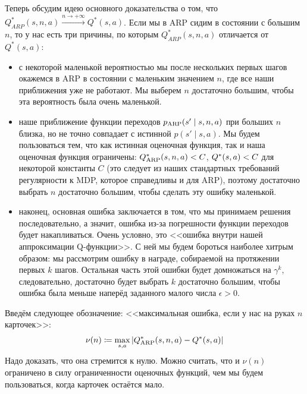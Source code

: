 Теперь обсудим идею основного доказательства о том, что $Q^*_{ARP}(s, n, a) \xrightarrow{ n \to +\infty } Q^*(s, a)$. Если мы в ARP сидим в состоянии с большим $n$, то у нас есть три причины, по которым $Q^*_{ARP}(s, n, a)$ отличается от $Q^*(s, a)$:
\begin{itemize}
    \item с некоторой маленькой вероятностью мы после нескольких первых шагов окажемся в ARP в состоянии с маленьким значением $n$, где все наши приближения уже не работают. Мы выберем $n$ достаточно большим, чтобы эта вероятность была очень маленькой.
    \item наше приближение функции переходов $p_{\mathrm{ARP}}(s' \mid s, n, a)$ при больших $n$ близка, но не точно совпадает с истинной $p(s' \mid s, a)$. Мы будем пользоваться тем, что как истинная оценочная функция, так и наша оценочная функция ограничены: $Q_{\ARP}^*(s, n, a) \HM< C$, $Q^*(s, a) \HM< C$ для некоторой константы $C$ (это следует из наших стандартных требований регулярности к MDP, которое справедливы и для ARP), поэтому достаточно выбрать $n$ достаточно большим, чтобы сделать эту ошибку маленькой.
    \item наконец, основная ошибка заключается в том, что мы принимаем решения последовательно, а значит, ошибка из-за погрешности функции переходов будет накапливаться. Очень условно, это <<ошибка внутри нашей аппроксимации Q-функции>>. С ней мы будем бороться наиболее хитрым образом: мы рассмотрим ошибку в награде, собираемой на протяжении первых $k$ шагов. Остальная часть этой ошибки будет домножаться на $\gamma^k$, следовательно, достаточно будет выбрать $k$ достаточно большим, чтобы ошибка была меньше наперёд заданного малого числа $\epsilon > 0$.
\end{itemize}

Введём следующее обозначение: <<максимальная ошибка, если у нас на руках $n$ карточек>>:
$$\nu(n) \coloneqq \max_{s, a} |Q_{\mathrm{ARP}}^*(s, n, a) - Q^*(s, a)|$$
Надо доказать, что она стремится к нулю. Можно считать, что и $\nu(n)$ ограничено в силу ограниченности оценочных функций, чем мы будем пользоваться, когда карточек остаётся мало.

